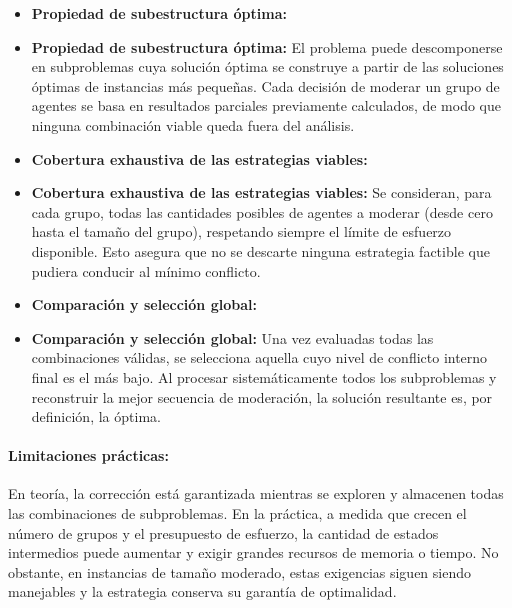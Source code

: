 \documentclass[11pt,letter]{article}
\begin{document}
    \begin{itemize}

      \item \textbf{Propiedad de subestructura óptima:}

      \item \textbf{Propiedad de subestructura óptima:}
      El problema puede descomponerse en subproblemas cuya solución óptima se construye a partir de las soluciones óptimas de instancias más pequeñas. Cada decisión de moderar un grupo de agentes se basa en resultados parciales previamente calculados, de modo que ninguna combinación viable queda fuera del análisis.

      \item \textbf{Cobertura exhaustiva de las estrategias viables:}

      \item \textbf{Cobertura exhaustiva de las estrategias viables:}
      Se consideran, para cada grupo, todas las cantidades posibles de agentes a moderar (desde cero hasta el tamaño del grupo), respetando siempre el límite de esfuerzo disponible. Esto asegura que no se descarte ninguna estrategia factible que pudiera conducir al mínimo conflicto.

      \item \textbf{Comparación y selección global:}

      \item \textbf{Comparación y selección global:}
      Una vez evaluadas todas las combinaciones válidas, se selecciona aquella cuyo nivel de conflicto interno final es el más bajo. Al procesar sistemáticamente todos los subproblemas y reconstruir la mejor secuencia de moderación, la solución resultante es, por definición, la óptima.


    \end{itemize}

    \paragraph{Limitaciones prácticas:}

    En teoría, la corrección está garantizada mientras se exploren y almacenen todas las combinaciones de subproblemas. En la práctica, a medida que crecen el número de grupos y el presupuesto de esfuerzo, la cantidad de estados intermedios puede aumentar y exigir grandes recursos de memoria o tiempo. No obstante, en instancias de tamaño moderado, estas exigencias siguen siendo manejables y la estrategia conserva su garantía de optimalidad.
\end{document}
